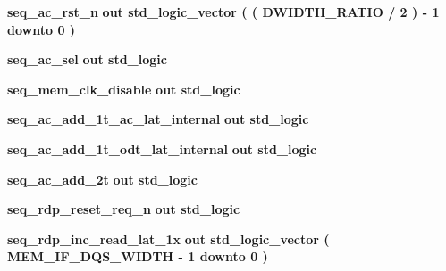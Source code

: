 \begin{DoxyCompactItemize}
\item 
{\bf seq\+\_\+ac\+\_\+rst\+\_\+n}  {\bfseries {\bfseries \textcolor{keywordflow}{out}\textcolor{vhdlchar}{ }}} {\bfseries \textcolor{comment}{std\+\_\+logic\+\_\+vector}\textcolor{vhdlchar}{ }\textcolor{vhdlchar}{(}\textcolor{vhdlchar}{ }\textcolor{vhdlchar}{(}\textcolor{vhdlchar}{ }\textcolor{vhdlchar}{ }\textcolor{vhdlchar}{ }\textcolor{vhdlchar}{ }{\bfseries {\bf D\+W\+I\+D\+T\+H\+\_\+\+R\+A\+T\+IO}} \textcolor{vhdlchar}{/}\textcolor{vhdlchar}{ } \textcolor{vhdldigit}{2} \textcolor{vhdlchar}{ }\textcolor{vhdlchar}{)}\textcolor{vhdlchar}{ }\textcolor{vhdlchar}{-\/}\textcolor{vhdlchar}{ } \textcolor{vhdldigit}{1} \textcolor{vhdlchar}{ }\textcolor{keywordflow}{downto}\textcolor{vhdlchar}{ }\textcolor{vhdlchar}{ } \textcolor{vhdldigit}{0} \textcolor{vhdlchar}{ }\textcolor{vhdlchar}{)}\textcolor{vhdlchar}{ }} 
\item 
{\bf seq\+\_\+ac\+\_\+sel}  {\bfseries {\bfseries \textcolor{keywordflow}{out}\textcolor{vhdlchar}{ }}} {\bfseries \textcolor{comment}{std\+\_\+logic}\textcolor{vhdlchar}{ }} 
\item 
{\bf seq\+\_\+mem\+\_\+clk\+\_\+disable}  {\bfseries {\bfseries \textcolor{keywordflow}{out}\textcolor{vhdlchar}{ }}} {\bfseries \textcolor{comment}{std\+\_\+logic}\textcolor{vhdlchar}{ }} 
\item 
{\bf seq\+\_\+ac\+\_\+add\+\_\+1t\+\_\+ac\+\_\+lat\+\_\+internal}  {\bfseries {\bfseries \textcolor{keywordflow}{out}\textcolor{vhdlchar}{ }}} {\bfseries \textcolor{comment}{std\+\_\+logic}\textcolor{vhdlchar}{ }} 
\item 
{\bf seq\+\_\+ac\+\_\+add\+\_\+1t\+\_\+odt\+\_\+lat\+\_\+internal}  {\bfseries {\bfseries \textcolor{keywordflow}{out}\textcolor{vhdlchar}{ }}} {\bfseries \textcolor{comment}{std\+\_\+logic}\textcolor{vhdlchar}{ }} 
\item 
{\bf seq\+\_\+ac\+\_\+add\+\_\+2t}  {\bfseries {\bfseries \textcolor{keywordflow}{out}\textcolor{vhdlchar}{ }}} {\bfseries \textcolor{comment}{std\+\_\+logic}\textcolor{vhdlchar}{ }} 
\item 
{\bf seq\+\_\+rdp\+\_\+reset\+\_\+req\+\_\+n}  {\bfseries {\bfseries \textcolor{keywordflow}{out}\textcolor{vhdlchar}{ }}} {\bfseries \textcolor{comment}{std\+\_\+logic}\textcolor{vhdlchar}{ }} 
\item 
{\bf seq\+\_\+rdp\+\_\+inc\+\_\+read\+\_\+lat\+\_\+1x}  {\bfseries {\bfseries \textcolor{keywordflow}{out}\textcolor{vhdlchar}{ }}} {\bfseries \textcolor{comment}{std\+\_\+logic\+\_\+vector}\textcolor{vhdlchar}{ }\textcolor{vhdlchar}{(}\textcolor{vhdlchar}{ }\textcolor{vhdlchar}{ }\textcolor{vhdlchar}{ }\textcolor{vhdlchar}{ }{\bfseries {\bf M\+E\+M\+\_\+\+I\+F\+\_\+\+D\+Q\+S\+\_\+\+W\+I\+D\+TH}} \textcolor{vhdlchar}{-\/}\textcolor{vhdlchar}{ } \textcolor{vhdldigit}{1} \textcolor{vhdlchar}{ }\textcolor{keywordflow}{downto}\textcolor{vhdlchar}{ }\textcolor{vhdlchar}{ } \textcolor{vhdldigit}{0} \textcolor{vhdlchar}{ }\textcolor{vhdlchar}{)}\textcolor{vhdlchar}{ }} 

\end{DoxyCompactItemize}
